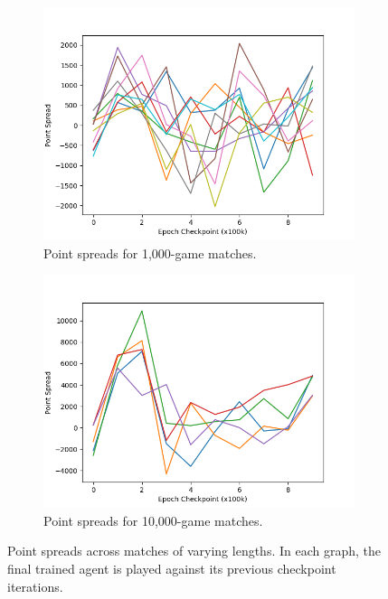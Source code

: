 \begin{figure}
\begin{subfigure}[b]{0.66\textwidth}
	\center
	\includegraphics[width=\textwidth]{images/discussion/usefulness/r2-time-series-1000.png}
	\caption{Point spreads for 1,000-game matches.}
	\label{fig:r2-time-series-1000}
\end{subfigure}

\begin{subfigure}[b]{0.66\textwidth}
	\center
	\includegraphics[width=\textwidth]{images/discussion/usefulness/r2-time-series-10000.png}
	\caption{Point spreads for 10,000-game matches.}
	\label{fig:r2-time-series-10000}
\end{subfigure}

\caption{
	Point spreads across matches of varying lengths.
	In each graph,
	the final trained agent is played against its previous checkpoint
	iterations.
}
\label{fig:r2-time-series}
\end{figure}
